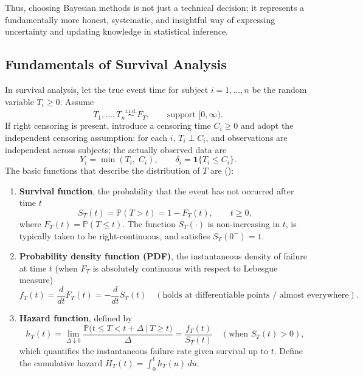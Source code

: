 Thus, choosing Bayesian methods is not just a technical decision; it represents a fundamentally more honest, systematic, and insightful way of expressing uncertainty and updating knowledge in statistical inference.






\subsection{Fundamentals of Survival Analysis} \label{Fundamentals of Survival Analysis}

In survival analysis, let the true event time for subject $i=1,\dots,n$ be the random variable $T_i\ge 0$. Assume
$$
T_1,\ldots,T_n \stackrel{\text{i.i.d.}}{\sim} F_T,\qquad \text{support }[0,\infty).
$$
If right censoring is present, introduce a censoring time $C_i\ge 0$ and adopt the independent censoring assumption: for each $i$, $T_i\perp C_i$, and observations are independent across subjects; the actually observed data are
$$
Y_i=\min(T_i,\;C_i),\qquad \delta_i=\mathbf 1\{T_i\le C_i\}.
$$
The basic functions that describe the distribution of $T$ are (\cite{kleinbaum1996survival}):
\begin{enumerate}
    \item \textbf{Survival function}, the probability that the event has not occurred after time $t$
   \begin{equation}
       S_T(t)=\mathbb P(T>t)=1-F_T(t),\qquad t\ge 0,
   \end{equation}
   where $F_T(t)=\mathbb P(T\le t)$. The function $S_T(\cdot)$ is non-increasing in $t$, is typically taken to be right-continuous, and satisfies $S_T(0^-)=1$.
   \item \textbf{Probability density function (PDF)}, the instantaneous density of failure at time $t$ (when $F_T$ is absolutely continuous with respect to Lebesgue measure)
   \begin{equation}
        f_T(t)=\frac{d}{dt}F_T(t)=-\frac{d}{dt}S_T(t)\quad(\text{holds at differentiable points / almost everywhere}).
   \end{equation}
   \item \textbf{Hazard function}, defined by
   \begin{equation}
          h_T(t)=\lim_{\Delta\downarrow 0}\frac{\mathbb P\big(t\le T<t+\Delta\ \big|\ T\ge t\big)}{\Delta}
          =\frac{f_T(t)}{S_T(t)}\quad(\text{when }S_T(t)>0),
   \end{equation}
   which quantifies the instantaneous failure rate given survival up to $t$. Define the cumulative hazard $H_T(t)=\int_0^{t} h_T(u)\,du.$
\end{enumerate}

